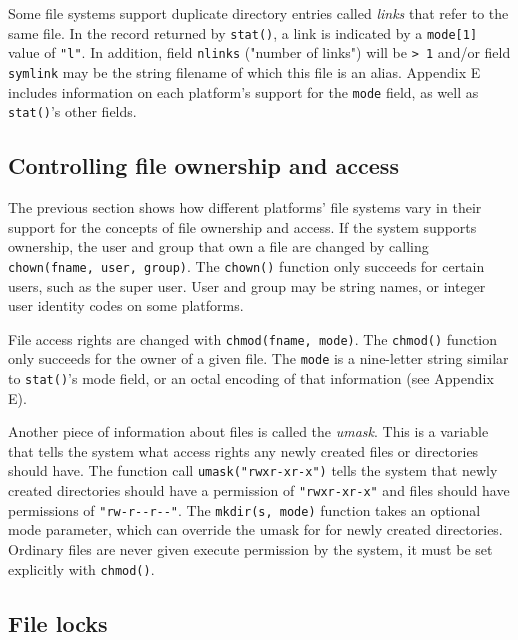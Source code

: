 Some file systems support duplicate directory entries called
\textit{links} that refer to the same file. In the record returned by
\texttt{stat()}, a link is indicated by a
\texttt{mode[1]} value of \texttt{"l"}. In addition, field
\texttt{nlinks} ("number of links") will be \texttt{{\textgreater} 1}
and/or field \texttt{symlink} may be the string filename of which this
file is an alias. Appendix E includes information on each platform's
support for the \texttt{mode} field, as well as \texttt{stat()}'s
other fields.

\subsection{Controlling file ownership and access}

The previous section shows how different
platforms' file systems vary in their support for the concepts of file
ownership and access. If the system supports ownership, the user and
group that own a file are changed by calling \texttt{chown(fname,
user, group)}. The \texttt{chown()} function only
succeeds for certain users, such as the super user.  User and group
may be string names, or integer user identity codes on some platforms.

File access rights are changed with \texttt{chmod(fname, mode)}. The
\texttt{chmod()} function only succeeds for the owner of a given
file. The \texttt{mode} is a nine-letter string similar to \texttt{stat()}'s
mode field, or an octal encoding of that information (see Appendix E).

Another piece of information about files is called the
\textit{umask}. This is a variable that tells the system what
access rights any newly created files or directories should have.  The function
call \texttt{umask("rwxr-xr-x")} tells the system that newly created directories
should have a permission of \texttt{"rwxr-xr-x"} and files should have
permissions of \texttt{"rw-r-{}-r-{}-"}.  The \texttt{mkdir(s, mode)} function
takes an optional mode parameter, which can override the umask for for newly
created directories.  Ordinary files are never given execute permission by the
system, it must be set explicitly with \texttt{chmod()}.

\subsection{File locks}

